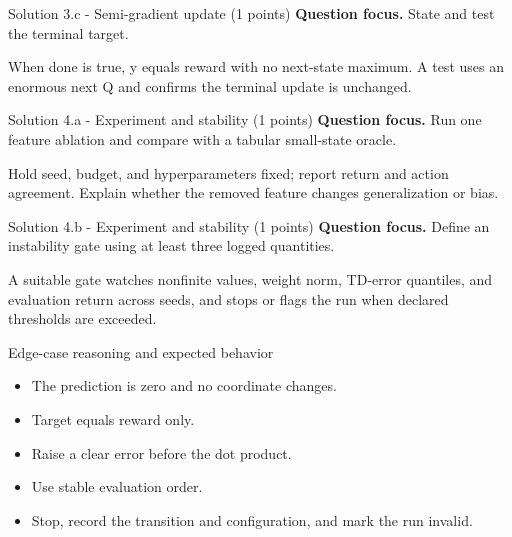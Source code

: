 \documentclass[aspectratio=169,11pt]{beamer}
\begin{document}
\begin{frame}{Solution 3.c - Semi-gradient update (1 points)}
\small
\textbf{Question focus.} State and test the terminal target.

\vspace{0.25cm}
\answerlabel When done is true, y equals reward with no next-state maximum. A test uses an enormous next Q and confirms the terminal update is unchanged.
\end{frame}

\begin{frame}{Solution 4.a - Experiment and stability (1 points)}
\small
\textbf{Question focus.} Run one feature ablation and compare with a tabular small-state oracle.

\vspace{0.25cm}
\answerlabel Hold seed, budget, and hyperparameters fixed; report return and action agreement. Explain whether the removed feature changes generalization or bias.
\end{frame}

\begin{frame}{Solution 4.b - Experiment and stability (1 points)}
\small
\textbf{Question focus.} Define an instability gate using at least three logged quantities.

\vspace{0.25cm}
\answerlabel A suitable gate watches nonfinite values, weight norm, TD-error quantiles, and evaluation return across seeds, and stops or flags the run when declared thresholds are exceeded.
\end{frame}

\begin{frame}{Edge-case reasoning and expected behavior}
\small
\begin{itemize}
  \item The prediction is zero and no coordinate changes.
  \item Target equals reward only.
  \item Raise a clear error before the dot product.
  \item Use stable evaluation order.
  \item Stop, record the transition and configuration, and mark the run invalid.
\end{itemize}
\end{frame}
\end{document}
